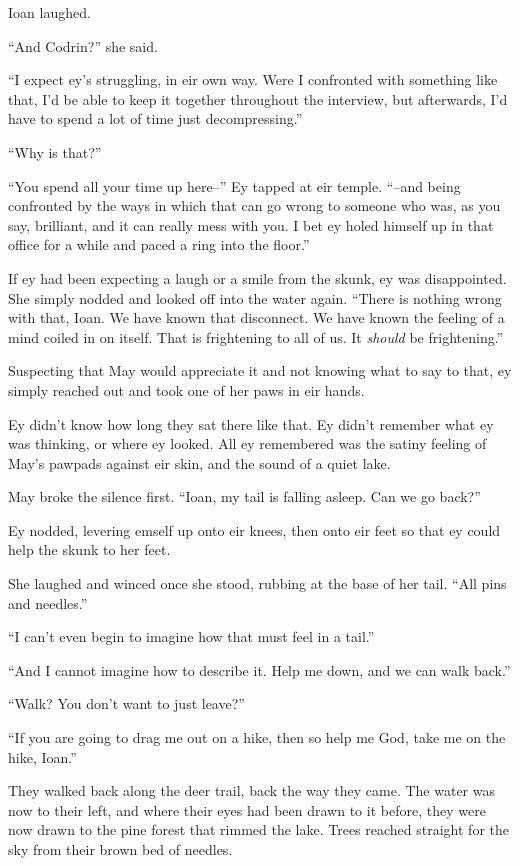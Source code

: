 Ioan laughed.

``And Codrin?'' she said.

``I expect ey's struggling, in eir own way. Were I confronted with something like that, I'd be able to keep it together throughout the interview, but afterwards, I'd have to spend a lot of time just decompressing.''

``Why is that?''

``You spend all your time up here--'' Ey tapped at eir temple. ``--and being confronted by the ways in which that can go wrong to someone who was, as you say, brilliant, and it can really mess with you. I bet ey holed himself up in that office for a while and paced a ring into the floor.''

If ey had been expecting a laugh or a smile from the skunk, ey was disappointed. She simply nodded and looked off into the water again. ``There is nothing wrong with that, Ioan. We have known that disconnect. We have known the feeling of a mind coiled in on itself. That is frightening to all of us. It \emph{should} be frightening.''

Suspecting that May would appreciate it and not knowing what to say to that, ey simply reached out and took one of her paws in eir hands.

Ey didn't know how long they sat there like that. Ey didn't remember what ey was thinking, or where ey looked. All ey remembered was the satiny feeling of May's pawpads against eir skin, and the sound of a quiet lake.

May broke the silence first. ``Ioan, my tail is falling asleep. Can we go back?''

Ey nodded, levering emself up onto eir knees, then onto eir feet so that ey could help the skunk to her feet.

She laughed and winced once she stood, rubbing at the base of her tail. ``All pins and needles.''

``I can't even begin to imagine how that must feel in a tail.''

``And I cannot imagine how to describe it. Help me down, and we can walk back.''

``Walk? You don't want to just leave?''

``If you are going to drag me out on a hike, then so help me God, take me on the hike, Ioan.''

They walked back along the deer trail, back the way they came. The water was now to their left, and where their eyes had been drawn to it before, they were now drawn to the pine forest that rimmed the lake. Trees reached straight for the sky from their brown bed of needles.

